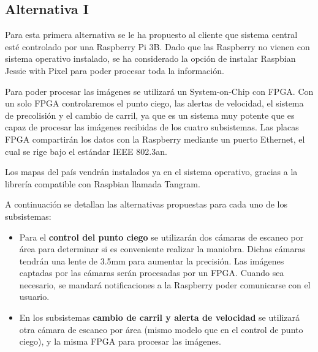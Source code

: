 \subsection{Alternativa I}

\par Para esta primera alternativa se le ha propuesto al cliente que sistema central esté controlado por una Raspberry Pi 3B. Dado que las Raspberry no vienen con sistema operativo instalado, se ha considerado la opción de instalar Raspbian Jessie with Pixel para poder procesar toda la información.
\par Para poder procesar las imágenes se utilizará un System-on-Chip con FPGA. Con un solo FPGA controlaremos el punto ciego, las alertas de velocidad, el sistema de precolisión y el cambio de carril, ya que es un sistema muy potente que es capaz de procesar las imágenes recibidas de los cuatro subsistemas. Las placas FPGA compartirán los datos con la Raspberry mediante un puerto Ethernet, el cual se rige bajo el estándar IEEE 802.3an.
\par Los mapas del país vendrán instalados ya en el sistema operativo, gracias a la librería compatible con Raspbian llamada Tangram.

\par A continuación se detallan las alternativas propuestas para cada uno de los subsistemas:

\begin{itemize}[-]
    \item Para el \textbf{control del punto ciego} se utilizarán dos cámaras de escaneo por área para determinar si es conveniente realizar la maniobra. Dichas cámaras tendrán una lente de 3.5mm para aumentar la precisión. Las imágenes captadas por las cámaras serán procesadas por un FPGA. Cuando sea necesario, se mandará notificaciones a la Raspberry poder comunicarse con el usuario.
    \item En los subsistemas \textbf{cambio de carril y alerta de velocidad} se utilizará otra cámara de escaneo por área (mismo modelo que en el control de punto ciego), y la misma FPGA para procesar las imágenes.
\end{itemize}

